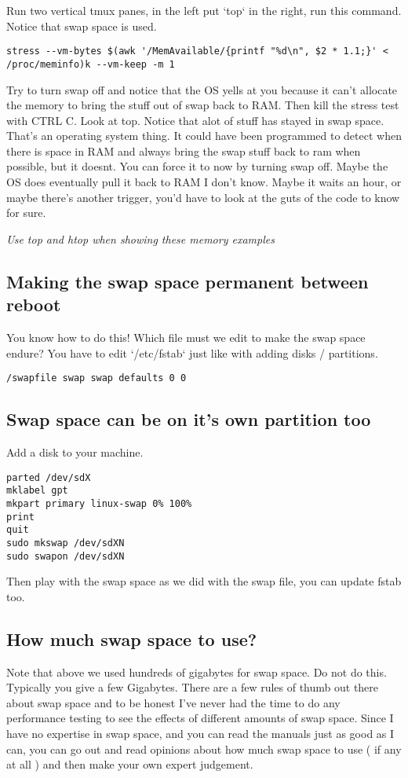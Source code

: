 \documentclass[10pt]{article}
\begin{document}
Run two vertical tmux panes, in the left put `top` in the right, run this command. Notice that swap space is used.

\begin{lstlisting}
stress --vm-bytes $(awk '/MemAvailable/{printf "%d\n", $2 * 1.1;}' < /proc/meminfo)k --vm-keep -m 1
\end{lstlisting}

Try to turn swap off and notice that the OS yells at you because it can't allocate the memory to bring the stuff out of swap back to RAM.
Then kill the stress test with CTRL C. Look at top. Notice that alot of stuff has stayed in swap space. That's an operating system thing. It could have been programmed to detect when there is space in RAM and always bring the swap stuff back to ram when possible, but it doesnt. You can force it to now by turning swap off. Maybe the OS does eventually pull it back to RAM I don't know. Maybe it waits an hour, or maybe there's another trigger, you'd have to look at the guts of the code to know for sure.

{\LARGE\textit{Use top and htop when showing these memory examples}}

\subsection{Making the swap space permanent between reboot}

You know how to do this! Which file must we edit to make the swap space endure?
You have to edit `/etc/fstab` just like with adding disks / partitions.

\begin{lstlisting}
/swapfile swap swap defaults 0 0
\end{lstlisting}

\subsection{Swap space can be on it's own partition too}
Add a disk to your machine.

\begin{lstlisting}
parted /dev/sdX
mklabel gpt
mkpart primary linux-swap 0% 100%
print
quit
sudo mkswap /dev/sdXN
sudo swapon /dev/sdXN
\end{lstlisting}

Then play with the swap space as we did with the swap file, you can update fstab too.

\subsection{How much swap space to use?}
Note that above we used hundreds of gigabytes for swap space. Do not do this. Typically you give a few Gigabytes. There are a few rules of thumb out there about swap space and to be honest I've never had the time to do any performance testing to see the effects of different amounts of swap space. Since I have no expertise in swap space, and you can read the manuals just as good as I can, you can go out and read opinions about how much swap space to use ( if any at all ) and then make your own expert judgement.
\end{document}
